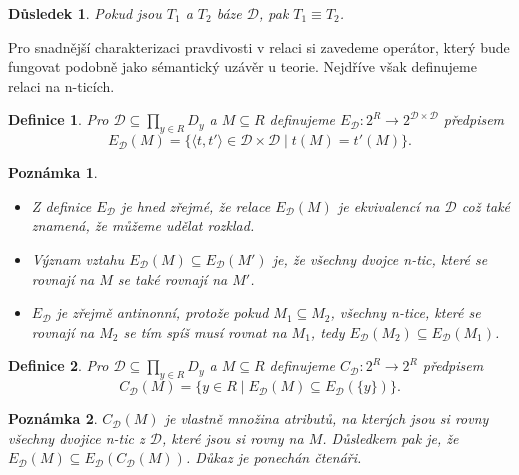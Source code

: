 \documentclass{article}
\newtheorem{definition}{Definice}
\newtheorem*{remark}{Poznámka}
\newtheorem*{corollary}{Důsledek}
\begin{document}
\begin {corollary}
  Pokud jsou $T_1$ a $T_2$ báze $\mathcal D$, pak $T_1\equiv T_2$.
\end {corollary}

Pro snadnější charakterizaci pravdivosti v relaci si zavedeme
operátor, který bude fungovat podobně jako sémantický uzávěr u
teorie. Nejdříve však definujeme relaci na n-ticích.

\begin{definition}
  Pro $\mathcal{D}\subseteq \prod_{y\in R}D_y$ a $M\subseteq R$
  definujeme $E_{\mathcal{D}}: 2^R \rightarrow 2^{\mathcal{D} \times
    \mathcal{D}}$ předpisem
  $$E_{\mathcal{D}}(M)= \{\langle t, t'\rangle\in \mathcal
  D\times \mathcal D \mid t(M)=t'(M)\}.$$
\end{definition}

\begin{remark}
\begin {itemize}
\item
  Z definice $E_{\mathcal{D}}$ je hned zřejmé, že relace
  $E_{\mathcal{D}}(M)$ je ekvivalencí na $\mathcal{D}$ což také
  znamená, že můžeme udělat rozklad.

\item
  Význam vztahu $E_{\mathcal{D}}(M)\subseteq E_{\mathcal{D}}(M')$ je,
  že všechny dvojce n-tic, které se rovnají na $M$ se také rovnají na
  $M'$.

\item
  $E_{\mathcal{D}}$ je zřejmě antinonní, protože pokud $M_1\subseteq
  M_2$, všechny n-tice, které se rovnají na $M_2$ se tím spíš musí
  rovnat na $M_1$, tedy $E_{\mathcal{D}}(M_2)\subseteq
  E_{\mathcal{D}}(M_1)$.
\end {itemize}
\end{remark}

\begin {definition}
  Pro $\mathcal{D}\subseteq \prod_{y\in R}D_y$ a $M\subseteq R$
  definujeme $C_{\mathcal D}: 2^R \rightarrow 2^R$ předpisem
  $$C_{\mathcal{D}}(M) = \{y \in R \mid E_{\mathcal{D}}(M) \subseteq
  E_{\mathcal{D}}(\{y\})\}.$$
\end {definition}
\begin {remark}
  $C_{\mathcal D}(M)$ je vlastně množina atributů, na kterých jsou si
  rovny všechny dvojice n-tic z $\mathcal{D}$, které jsou si rovny na
  $M$. Důsledkem pak je, že $E_{\mathcal{D}}(M)\subseteq
  E_{\mathcal{D}}(C_{\mathcal D}(M))$. Důkaz je ponechán čtenáři.
\end {remark}
\end{document}
